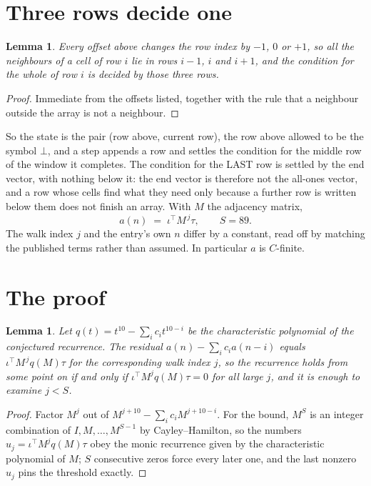 \documentclass[11pt,a4paper]{article}
\theoremstyle{plain}
\newtheorem{lemma}[theorem]{Lemma}
\theoremstyle{definition}
\begin{document}
\section{Three rows decide one}

\begin{lemma}\label{lem:win}
Every offset above changes the row index by $-1$, $0$ or $+1$, so all the neighbours of a cell
of row $i$ lie in rows $i-1$, $i$ and $i+1$, and the condition for the whole of row $i$ is
decided by those three rows.
\end{lemma}

\begin{proof}
Immediate from the offsets listed, together with the rule that a neighbour outside the array is
not a neighbour.
\end{proof}

So the state is the pair (row above, current row), the row above allowed to be the symbol
$\bot$, and a step appends a row and settles the condition for the middle row of the window it
completes. The condition for the LAST row is settled by the end vector, with nothing below it:
the end vector is therefore not the all-ones vector, and a row whose cells find what they need
only because a further row is written below them does not finish an array. With $M$ the
adjacency matrix,
\[
a(n)\;=\;\iota^{\!\top}M^{\,j}\tau ,\qquad S=89.
\]
The walk index $j$ and the entry's own $n$ differ by a constant, read off by matching the
published terms rather than assumed. In particular $a$ is $C$-finite.

\section{The proof}

\begin{lemma}\label{lem:crit}
Let $q(t)=t^{10}-\sum_i c_it^{10-i}$ be the characteristic polynomial of the
conjectured recurrence. The residual $a(n)-\sum_ic_ia(n-i)$ equals
$\iota^{\!\top}M^{\,j}q(M)\tau$ for the corresponding walk index $j$, so the recurrence
holds from some point on if and only if $\iota^{\!\top}M^{j}q(M)\tau=0$ for all large $j$,
and it is enough to examine $j<S$.
\end{lemma}

\begin{proof}
Factor $M^{j}$ out of $M^{j+10}-\sum_ic_iM^{j+10-i}$. For the bound, $M^{S}$
is an integer combination of $I,M,\dots,M^{S-1}$ by Cayley--Hamilton, so the numbers
$u_j=\iota^{\!\top}M^{j}q(M)\tau$ obey the monic recurrence given by the characteristic
polynomial of $M$; $S$ consecutive zeros force every later one, and the last nonzero $u_j$
pins the threshold exactly.
\end{proof}
\end{document}
